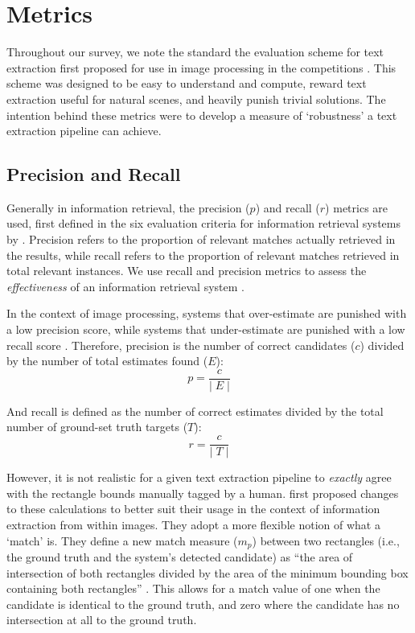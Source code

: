 \section{Metrics}
\label{sec:background:metrics}

Throughout our survey, we note the standard the evaluation scheme for text extraction first proposed for use in image processing in the  competitions \citep{Lucas:2003iw, Lucas:2005bq, Shahab:2011hq, Karatzas:2013by, Karatzas:2015tj}. This scheme was designed to be easy to understand and compute, reward text extraction useful for natural scenes, and heavily punish trivial solutions. The intention behind these metrics were to develop a measure of `robustness' a text extraction pipeline can achieve.

\subsection{Precision and Recall}
\label{sec:background:metrics:precision_and_recall}

Generally in information retrieval, the precision ($p$) and recall ($r$) metrics are used, first defined in the six evaluation criteria for information retrieval systems by \citet{Cleverdon:1966vd}. Precision refers to the proportion of relevant matches actually retrieved in the results, while recall refers to the proportion of relevant matches retrieved in total relevant instances. We use recall and precision metrics to assess the \textit{effectiveness} of an information retrieval system \citep{Rijsbergen:1979dw}.

In the context of image processing, systems that over-estimate are punished with a low precision score, while systems that under-estimate are punished with a low recall score \citep{Lucas:2003iw}. Therefore, precision is the number of correct candidates ($c$) divided by the number of total estimates found ($E$):
\begin{equation*}
  p = \frac{c}{\lvert\;E\;\rvert}
\end{equation*}

And recall is defined as the number of correct estimates divided by the total number of ground-set truth targets ($T$):
\begin{equation*}
  r = \frac{c}{\lvert\;T\;\rvert}
\end{equation*}

However, it is not realistic for a given text extraction pipeline to \textit{exactly} agree with the rectangle bounds manually tagged by a human. \citet{Lucas:2003iw} first proposed changes to these calculations to better suit their usage in the context of information extraction from within images. They adopt a more flexible notion of what a `match' is. They define a new match measure ($m_{p}$) between two rectangles (i.e., the ground truth and the system's detected candidate) as ``the area of intersection of both rectangles divided by the area of the minimum bounding box containing both rectangles'' \citep{Lucas:2003iw}. This allows for a match value of one when the candidate is identical to the ground truth, and zero where the candidate has no intersection at all to the ground truth.

